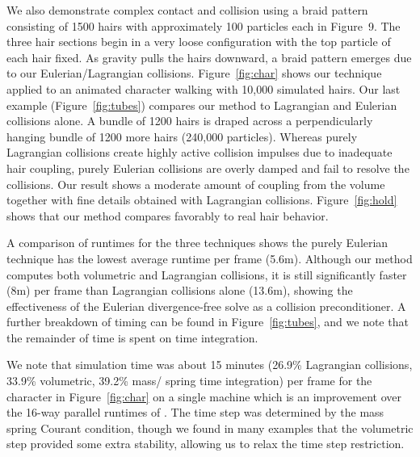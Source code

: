 We also demonstrate complex contact and collision
using a braid pattern consisting of 1500 hairs with approximately 100 particles
each in Figure~9.
The three hair sections begin in a very loose configuration with the top particle of
each hair fixed.  As gravity pulls the hairs downward, a braid pattern emerges
due to our Eulerian/Lagrangian collisions.
Figure~\ref{fig:char} shows our technique applied to an animated
character walking with 10,000 simulated hairs. 
Our last example (Figure~\ref{fig:tubes}) compares our method to
Lagrangian and Eulerian collisions alone. A bundle of 1200 hairs is draped
across a perpendicularly hanging bundle of 1200 more hairs (240,000
particles). Whereas purely Lagrangian collisions create highly active collision
impulses due to inadequate hair coupling, purely Eulerian collisions are overly damped and
fail to resolve the collisions.  Our result shows a moderate amount of coupling
from the volume together with fine details obtained with Lagrangian collisions.
Figure~\ref{fig:hold} shows that our method  compares favorably to real hair behavior.  

A comparison of runtimes for the three techniques shows the purely Eulerian
technique has the lowest average runtime per frame (5.6m).  Although our
method computes both volumetric and Lagrangian collisions, it is still
significantly faster (8m) per frame than
Lagrangian collisions alone (13.6m), showing the effectiveness of the Eulerian
divergence-free solve as a collision preconditioner.  A further breakdown of
timing can be found in Figure~\ref{fig:tubes}, and we note that the remainder
of time is spent on time integration.


We note that simulation time was about 15 minutes (26.9\% Lagrangian
collisions, 33.9\% volumetric, 39.2\% mass/ spring time integration)
per frame for the character in Figure~\ref{fig:char} on a single machine which is an
improvement over the 16-way parallel runtimes of \cite{selle:2008:hair}. 
The time step was determined by the mass spring Courant condition, though we found
in many examples that the volumetric step provided some extra stability,
allowing us to relax the time step restriction.



